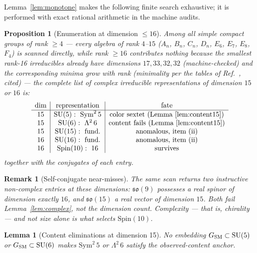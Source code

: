 \documentclass[
  aps,
  prd,
  preprint,
  nofootinbib,
  superscriptaddress,
  longbibliography
]{revtex4-2}
\newcommand{\Spin}{\mathrm{Spin}}
\newcommand{\SU}{\mathrm{SU}}
\newtheorem{proposition}[theorem]{Proposition}
\newtheorem{lemma}[theorem]{Lemma}
\newtheorem{remark}[theorem]{Remark}
\begin{document}
Lemma~\ref{lem:monotone} makes the following finite search exhaustive; it
is performed with exact rational arithmetic in the machine audits.

\begin{proposition}[Enumeration at dimension \(\le16\)]
\label{prop:enumeration}
Among all simple compact groups of rank \(\ge4\) --- every algebra of rank
\(4\)--\(15\) (\(A_n\), \(B_n\), \(C_n\), \(D_n\), \(E_6\), \(E_7\),
\(E_8\), \(F_4\)) is scanned directly, while rank \(\ge16\) contributes
nothing because the smallest rank-16 irreducibles already have dimensions
\(17,33,32,32\) (machine-checked) and the corresponding minima grow with
rank (minimality per the tables of Ref.~\cite{Slansky1981}, cited) --- the
complete list of complex irreducible representations of dimension \(15\) or
\(16\) is:
\[
\begin{array}{c|c|c}
\dim & \text{representation} & \text{fate}\\
\hline
15 & \SU(5):\ \mathrm{Sym}^2\,5 & \text{color sextet (Lemma~\ref{lem:content15})}\\
15 & \SU(6):\ \Lambda^2\,6 & \text{content fails (Lemma~\ref{lem:content15})}\\
15 & \SU(15):\ \text{fund.} & \text{anomalous, item (ii)}\\
16 & \SU(16):\ \text{fund.} & \text{anomalous, item (ii)}\\
16 & \Spin(10):\ 16 & \text{survives}
\end{array}
\]
together with the conjugates of each entry.
\end{proposition}

\begin{remark}[Self-conjugate near-misses]
\label{rem:nearmiss}
The same scan returns two instructive non-complex entries at these
dimensions: \(\mathfrak{so}(9)\) possesses a \emph{real} spinor of
dimension exactly \(16\), and \(\mathfrak{so}(15)\) a real vector of
dimension \(15\).  Both fail Lemma~\ref{lem:complex}, not the dimension
count.  Complexity --- that is, chirality --- and not size alone is what
selects \(\Spin(10)\).
\end{remark}

\begin{lemma}[Content eliminations at dimension 15]
\label{lem:content15}
No embedding \(G_{\rm SM}\subset\SU(5)\) or \(G_{\rm SM}\subset\SU(6)\)
makes \(\mathrm{Sym}^2\,5\) or \(\Lambda^2\,6\) satisfy the
observed-content anchor.
\end{lemma}
\end{document}
